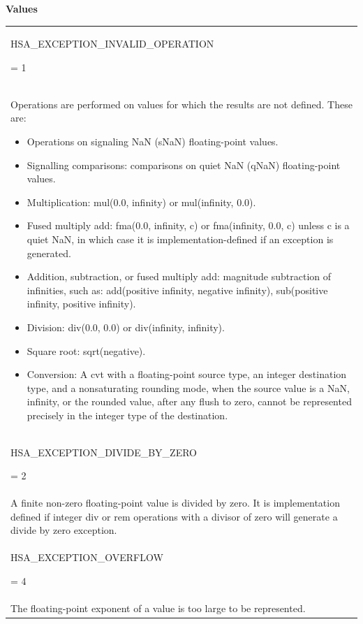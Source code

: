 \documentclass[final]{book}
\newcommand{\reftyp}[1]{#1}
\newcommand{\refenu}[1]{\reftyp{#1}}
\begin{document}
\begin{appendices}
\noindent\textbf{Values}\\[-5mm]
\begin{longtable}{@{\hspace{2em}}p{\linewidth-2em}}
\hspace{-2em}\hypertarget{group--FinalizerCoreApi-1gga1bb9da9f1f4527de3a54d5fdc5d24ef1a8710b7e984411a7e1979db2745cd2d01}{\refenu{HSA_EXCEPTION_INVALID_OPERATION}} = 1\\Operations are performed on values for which the results are not defined. These are:
\begin{itemize}\item Operations on signaling NaN (sNaN) floating-point values.
\item Signalling comparisons: comparisons on quiet NaN (qNaN) floating-point values.
\item Multiplication: mul(0.0, infinity) or mul(infinity, 0.0).
\item Fused multiply add: fma(0.0, infinity, c) or fma(infinity, 0.0, c) unless c is a quiet NaN, in which case it is implementation-defined if an exception is generated.
\item Addition, subtraction, or fused multiply add: magnitude subtraction of infinities, such as: add(positive infinity, negative infinity), sub(positive infinity, positive infinity).
\item Division: div(0.0, 0.0) or div(infinity, infinity).
\item Square root: sqrt(negative).
\item Conversion: A cvt with a floating-point source type, an integer destination type, and a nonsaturating rounding mode, when the source value is a NaN, infinity, or the rounded value, after any flush to zero, cannot be represented precisely in the integer type of the destination. 
\end{itemize}\\[2mm]
\hspace{-2em}\hypertarget{group--FinalizerCoreApi-1gga1bb9da9f1f4527de3a54d5fdc5d24ef1aa04d2ec3debe0bfb8cce607962449327}{\refenu{HSA_EXCEPTION_DIVIDE_BY_ZERO}} = 2\\A finite non-zero floating-point value is divided by zero. It is implementation defined if integer div or rem operations with a divisor of zero will generate a divide by zero exception.\\[2mm]
\hspace{-2em}\hypertarget{group--FinalizerCoreApi-1gga1bb9da9f1f4527de3a54d5fdc5d24ef1a1a73d8638fd835074a52e8a8358afe78}{\refenu{HSA_EXCEPTION_OVERFLOW}} = 4\\The floating-point exponent of a value is too large to be represented.\\[2mm]

\end{longtable}
\end{appendices}
\end{document}
